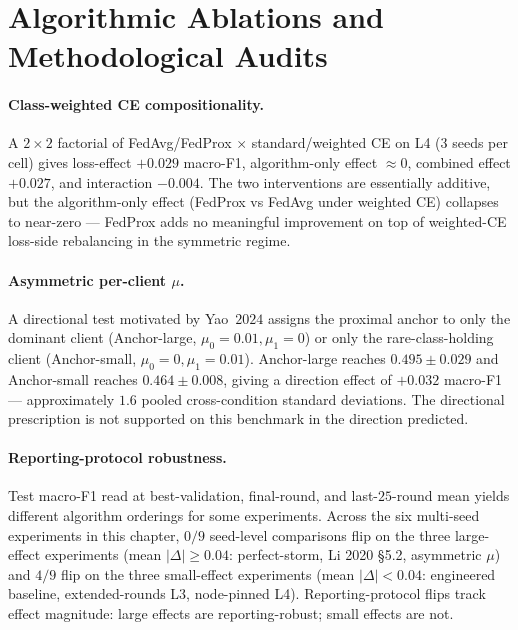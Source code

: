 \documentclass[11pt,a4paper]{report}
\begin{document}
\section{Algorithmic Ablations and Methodological Audits}
\label{sec:cond-ablations}

\paragraph{Class-weighted CE compositionality.}
A $2 \times 2$ factorial of FedAvg/FedProx $\times$ standard/weighted CE
on L4 (3 seeds per cell) gives loss-effect $+0.029$ macro-F1,
algorithm-only effect $\approx 0$, combined effect $+0.027$, and
interaction $-0.004$. The two interventions are essentially additive, but
the algorithm-only effect (FedProx vs FedAvg under weighted CE) collapses
to near-zero --- FedProx adds no meaningful improvement on top of
weighted-CE loss-side rebalancing in the symmetric regime.

\paragraph{Asymmetric per-client $\mu$.}
A directional test motivated by Yao~$2024$ assigns the proximal anchor to
only the dominant client (Anchor-large, $\mu_0 = 0.01, \mu_1 = 0$) or only
the rare-class-holding client (Anchor-small, $\mu_0 = 0, \mu_1 = 0.01$).
Anchor-large reaches $0.495 \pm 0.029$ and Anchor-small reaches
$0.464 \pm 0.008$, giving a direction effect of $+0.032$ macro-F1 ---
approximately $1.6$ pooled cross-condition standard deviations. The
directional prescription is not supported on this benchmark in the
direction predicted.

\paragraph{Reporting-protocol robustness.}
Test macro-F1 read at best-validation, final-round, and last-$25$-round
mean yields different algorithm orderings for some experiments. Across the
six multi-seed experiments in this chapter, $0/9$ seed-level comparisons
flip on the three large-effect experiments (mean $|\Delta| \geq 0.04$:
perfect-storm, Li 2020 §5.2, asymmetric $\mu$) and $4/9$ flip on the three
small-effect experiments (mean $|\Delta| < 0.04$: engineered baseline,
extended-rounds L3, node-pinned L4). Reporting-protocol flips track effect
magnitude: large effects are reporting-robust; small effects are not.
\end{document}
